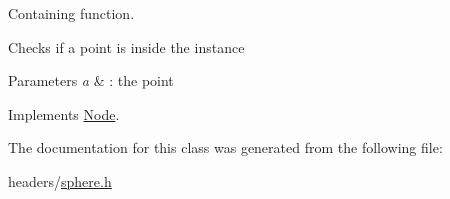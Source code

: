 \-Containing function. 

\-Checks if a point is inside the instance


\begin{DoxyParams}{\-Parameters}
{\em a} & \-: the point \\
\hline
\end{DoxyParams}


\-Implements \hyperlink{class_node_aeecdf01a88be40840b65eb34cecc7a3c}{\-Node}.



\-The documentation for this class was generated from the following file\-:\begin{DoxyCompactItemize}
\item 
headers/\hyperlink{sphere_8h}{sphere.\-h}\end{DoxyCompactItemize}
